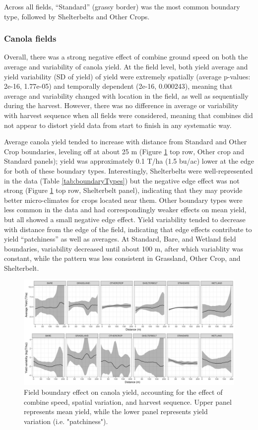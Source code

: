 \documentclass[]{elsarticle} %
\begin{document}
Across all fields, ``Standard'' (grassy border) was the most common boundary type, followed by Shelterbelts and Other Crops.

\hypertarget{canola-fields}{%
\subsubsection{Canola fields}\label{canola-fields}}

Overall, there was a strong negative effect of combine ground speed on both the average and variability of canola yield.
At the field level, both yield average and yield variability (SD of yield) of yield were extremely spatially (average p-values: 2e-16, 1.77e-05) and temporally dependent (2e-16, 0.000243), meaning that average and variability changed with location in the field, as well as sequentially during the harvest.
However, there was no difference in average or variability with harvest sequence when all fields were considered, meaning that combines did not appear to distort yield data from start to finish in any systematic way.

Average canola yield tended to increase with distance from Standard and Other Crop boundaries, leveling off at about 25 m (Figure \ref{fig:canolaPlot} top row, Other crop and Standard panels); yield was approximately 0.1 T/ha (1.5 bu/ac) lower at the edge for both of these boundary types.
Interestingly, Shelterbelts were well-represented in the data (Table \ref{tab:boundaryTypes}) but the negative edge effect was not strong (Figure \ref{fig:canolaPlot} top row, Shelterbelt panel), indicating that they may provide better micro-climates for crops located near them.
Other boundary types were less common in the data and had correspondingly weaker effects on mean yield, but all showed a small negative edge effect.
Yield variability tended to decrease with distance from the edge of the field, indicating that edge effects contribute to yield ``patchiness'' as well as averages.
At Standard, Bare, and Wetland field boundaries, variability decreased until about 100 m, after which variablity was constant, while the pattern was less consistent in Grassland, Other Crop, and Shelterbelt.

\begin{figure}
\includegraphics[width=1\linewidth]{../Figures/ModelSummary3a_canola} \caption{Field boundary effect on canola yield, accounting for the effect of combine speed, spatial variation, and harvest sequence. Upper panel represents mean yield, while the lower panel represents yield variation (i.e. "patchiness").}\label{fig:canolaPlot}
\end{figure}
\end{document}
